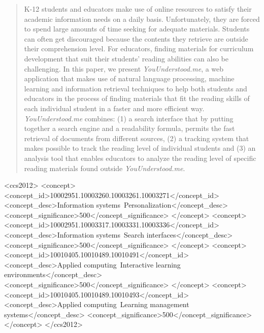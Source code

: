 \documentclass{sig-alternate-05-2015}
\begin{document}
\maketitle
\begin{abstract}


K-12 students and educators make use of online resources to satisfy their academic information needs on a daily basis. Unfortunately, they are forced to spend large amounts of time seeking for adequate materials. Students can often get discouraged because the contents they retrieve are outside their comprehension level. For educators, finding materials for curriculum development that suit their students' reading abilities can also be challenging.  In this paper, we present \textit{YouUnderstood.me}, a web application that makes use of natural language processing, machine learning and information retrieval techniques to help both students and educators in the process of finding materials that fit the reading skills of each individual student in a faster and more efficient way. \textit{YouUnderstood.me} combines: (1) a search interface that by putting together a search engine and a readability formula, permits the fast retrieval of documents from different sources, (2)  a tracking system that makes possible to  track the reading level of individual students  and (3) an analysis tool that enables educators to analyze the reading level of specific reading materials found outside \textit{YouUnderstood.me}.






\end{abstract}


%
%



\begin{CCSXML}
<ccs2012>
<concept>
<concept_id>10002951.10003260.10003261.10003271</concept_id>
<concept_desc>Information systems~Personalization</concept_desc>
<concept_significance>500</concept_significance>
</concept>
<concept>
<concept_id>10002951.10003317.10003331.10003336</concept_id>
<concept_desc>Information systems~Search interfaces</concept_desc>
<concept_significance>500</concept_significance>
</concept>
<concept>
<concept_id>10010405.10010489.10010491</concept_id>
<concept_desc>Applied computing~Interactive learning environments</concept_desc>
<concept_significance>500</concept_significance>
</concept>
<concept>
<concept_id>10010405.10010489.10010493</concept_id>
<concept_desc>Applied computing~Learning management systems</concept_desc>
<concept_significance>500</concept_significance>
</concept>
</ccs2012>
\end{CCSXML}
\end{document}
